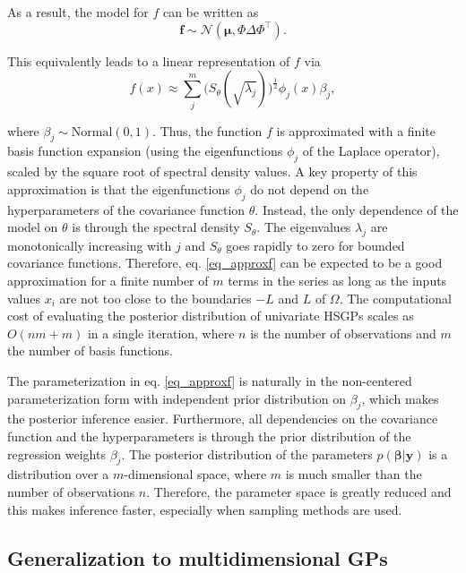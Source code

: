 \documentclass[onecolumn,a4paper,11pt]{article}
\begin{document}
\noindent As a result, the model for $f$ can be written as
%
\begin{equation}
\bm{f} \sim \mathcal{N}(\bm{\mu},\Phi \Delta \Phi^\intercal). \nonumber
\end{equation}

\noindent This equivalently leads to a linear representation of $f$ via
%
\begin{equation}\label{eq_approxf}
f(x) \approx \sum_{j}^m \big( S_{\theta}(\sqrt{\lambda_j})\big)^{\! \frac{1}{2}} \phi_j(x) \beta_j,
\end{equation}

\noindent where $\beta_j \sim \text{Normal}(0,1)$. Thus, the function $f$ is approximated with a finite basis function expansion (using the eigenfunctions $\phi_j$ of the Laplace operator), scaled by the square root of spectral density values. A key property of this approximation is that the eigenfunctions $\phi_j$ do not depend on the hyperparameters of the covariance function $\theta$. Instead, the only dependence of the model on $\theta$ is through the spectral density $S_{\theta}$. The eigenvalues $\lambda_j$ are monotonically increasing with $j$ and $S_{\theta}$ goes rapidly to zero for bounded covariance functions. Therefore, eq. \eqref{eq_approxf} can be expected to be a good approximation for a finite number of $m$ terms in the series as long as the inputs values $x_i$ are not too close to the boundaries $-L$ and $L$ of $\Omega$. The computational cost of evaluating the posterior distribution of univariate HSGPs scales as $O(nm + m)$ in a single iteration, where $n$ is the number of observations and $m$ the number of basis functions.

The parameterization in eq. \eqref{eq_approxf} is naturally in the non-centered parameterization form with independent prior distribution on $\beta_j$, which makes the posterior inference easier. Furthermore, all dependencies on the covariance function and the hyperparameters is through the prior distribution of the regression weights $\beta_j$. The posterior distribution of the parameters $p(\bm{\beta}|\bm{y})$ is a distribution over a $m$-dimensional space, where $m$ is much smaller than the number of observations $n$. Therefore, the parameter space is greatly reduced and this makes inference faster, especially when sampling methods are used.

\subsection{Generalization to multidimensional GPs} \label{ch5_sec_method_multi}
\end{document}
